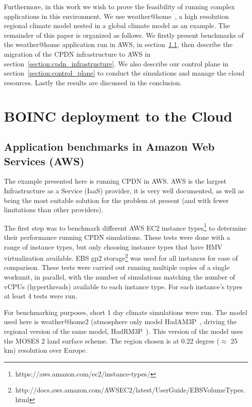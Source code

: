 \documentclass[journal abbreviation, manuscript]{copernicus}
\begin{document}
Furthermore, in this work we wish to prove the feasibility of running complex applications in this environment. We use weather@home~\citep{massey2015}, a high resolution regional climate model nested in a global climate model as an example. The remainder of this paper is organized as follows. We firstly present benchmarks of the weather@home application run in AWS, in section~\ref{section:benchmarks}, then describe the migration of the CPDN infrastructure to AWS in section~\ref{section:cpdn_infrastructure}. We also describe our control plane in section~\ref{section:control_plane} to conduct the simulations and manage the cloud resources. Lastly the results are discussed in the conclusion.

\section{BOINC deployment to the Cloud}

\subsection{Application benchmarks in Amazon Web Services (AWS)}
\label{section:benchmarks}

The example presented here is running CPDN in AWS. AWS is the largest Infrastructure as a Service (IaaS) provider, it is very well documented, as well as being the most suitable solution for the problem at present (and with fewer limitations than other providers).

The first step was to benchmark different AWS EC2 instance types\footnote{https://aws.amazon.com/ec2/instance-types/} to determine their performance running CPDN simulations. These tests were done with a range of instance types, but only choosing instance types that have HMV virtualization available. EBS gp2 storage\footnote{http://docs.aws.amazon.com/AWSEC2/latest/UserGuide/EBSVolumeTypes.html} was used for all instances for ease of comparison. These tests were carried out running multiple copies of a single workunit, in parallel, with the number of simulations matching the number of vCPUs (hyperthreads) available to each instance type. For each instance's types at least 4 tests were run.

For benchmarking purposes, short 1 day climate simulations were run.  The model used here is weather@home2 (atmosphere only model HadAM3P~\citep{gordon2000}, driving the regional version of the same model, HadRM3P~\citep{pope2000}). This version of the model uses the MOSES 2 land surface scheme. The region chosen is at 0.22 degree ($\approx$ 25 km) resolution over Europe.
\end{document}
